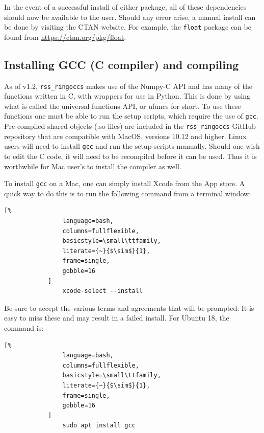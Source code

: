\documentclass[titlepage, 12pt]{article}
\begin{document}
            In the event of a successful install of either package,
            all of these dependencies should now be available to the
            user. Should any error arise, a manual install can be
            done by visiting the CTAN website. For example, the
            \texttt{float} package can be found
            from \url{https://ctan.org/pkg/float}.
        \subsection{Installing GCC (C compiler) and compiling}
            As of v1.2, \texttt{rss\_ringoccs} makes use of the
            Numpy-C API and has many of the functions written in C,
            with wrappers for use in Python. This is done by
            using what is called the universal functions API, or
            ufuncs for short. To use these functions one must be able
            to run the setup scripts, which require the use of
            \texttt{gcc}. Pre-compiled shared objects (.so files)
            are included in the \texttt{rss\_ringoccs} GitHub repository that are
            compatible with MacOS, versions 10.12 and higher. Linux users
            will need to install \texttt{gcc} and run the setup
            scripts manually. Should one wish to edit the C code,
            it will need to be recompiled before it can be used. Thus
            it is worthwhile for Mac user's to install the compiler
            as well.
            \par\hfill\par
            To install \texttt{gcc} on a Mac, one can simply install
            Xcode from the App store. A quick way to do this is to
            run the following command from a terminal window:
            \begin{lstlisting}[%
                language=bash,
                columns=fullflexible,
                basicstyle=\small\ttfamily,
                literate={~}{$\sim$}{1},
                frame=single,
                gobble=16
            ]
                xcode-select --install
            \end{lstlisting}
            Be sure to accept the various terms and agreements that
            will be prompted. It is easy to miss these and may result
            in a failed install. For Ubuntu 18, the command is:
            \begin{lstlisting}[%
                language=bash,
                columns=fullflexible,
                basicstyle=\small\ttfamily,
                literate={~}{$\sim$}{1},
                frame=single,
                gobble=16
            ]
                sudo apt install gcc
            \end{lstlisting}
\end{document}
